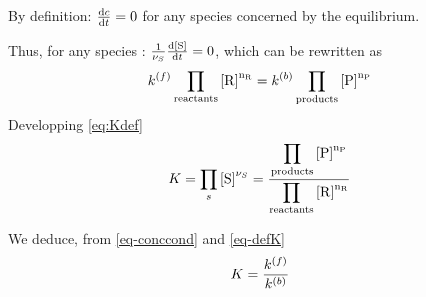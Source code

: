 By definition: $\frac{\dd \conc}{\dd t} = 0$ for any species concerned by the equilibrium.

Thus, for any species : 
$\frac{1}{\scoef[S]}\frac{\dd\conc[S]}{\dd t} =  0$, which can be rewritten as
\begin{equation}
\fwdrate \prodReac = \bkwdrate \prodProd
\label{eq-conccond}
\end{equation}
Developping \ref{eq:Kdef}
\begin{equation}
\Eqconst = \prod_{s}\conc[S]^{\scoef[S]} 
          = \frac{\displaystyle\prodProd}
                 {\displaystyle\prodReac}
\label{eq-defK}
\end{equation}

We deduce, from \ref{eq-conccond} and \ref{eq-defK}
\begin{equation}
\Eqconst = \frac{\fwdrate}{\bkwdrate}
\end{equation}

